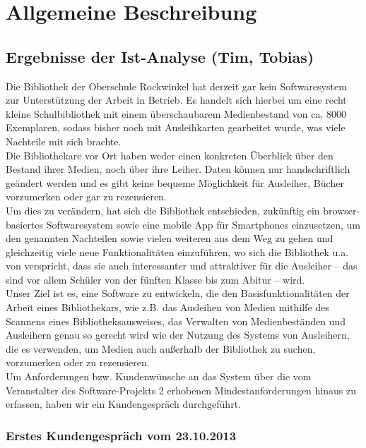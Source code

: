 \documentclass[fontsize=12pt,paper=a4,twoside]{scrartcl}
\begin{document}
\section{Allgemeine Beschreibung}
\label{ch:AllgemeineBeschreibung}

\subsection{Ergebnisse der Ist-Analyse (Tim, Tobias)}

Die Bibliothek der Oberschule Rockwinkel hat derzeit gar kein Softwaresystem zur Unterstützung der Arbeit in Betrieb. Es handelt sich hierbei um eine recht kleine Schulbibliothek mit einem überschaubarem Medienbestand von ca. 8000 Exemplaren, sodass bisher noch mit Ausleihkarten gearbeitet wurde, was viele Nachteile mit sich brachte. \\
Die Bibliothekare vor Ort haben weder einen konkreten Überblick über den Bestand ihrer Medien, noch über ihre Leiher. Daten können nur handschriftlich geändert werden und es gibt keine bequeme Möglichkeit für Ausleiher, Bücher vorzumerken oder gar zu rezensieren. \\
Um dies zu verändern, hat sich die Bibliothek entschieden, zukünftig ein browser-basiertes Softwaresystem sowie eine mobile App für Smartphones einzusetzen, um den genannten Nachteilen sowie vielen weiteren aus dem Weg zu gehen und gleichzeitig viele neue Funktionalitäten einzuführen, wo sich die Bibliothek u.a. von verspricht, dass sie auch interessanter und attraktiver für die Ausleiher  -- das sind vor allem Schüler von der fünften Klasse bis zum Abitur -- wird. \\
Unser Ziel ist es, eine Software zu entwickeln, die den Basisfunktionalitäten der Arbeit eines Bibliothekars, wie z.B. das Ausleihen von Medien mithilfe des Scannens eines Bibliotheksausweises, das Verwalten von Medienbeständen und Ausleihern genau so gerecht wird wie der Nutzung des Systems von Ausleihern, die es verwenden, um Medien auch außerhalb der Bibliothek zu suchen, vorzumerken oder zu rezensieren. \\
Um Anforderungen bzw. Kundenwünsche an das System über die vom Veranstalter des Software-Projekts 2 erhobenen Mindestanforderungen hinaus zu erfassen, haben wir ein Kundengespräch durchgeführt.

\subsubsection{Erstes Kundengespräch vom 23.10.2013} \label{kundengesp}
\end{document}

